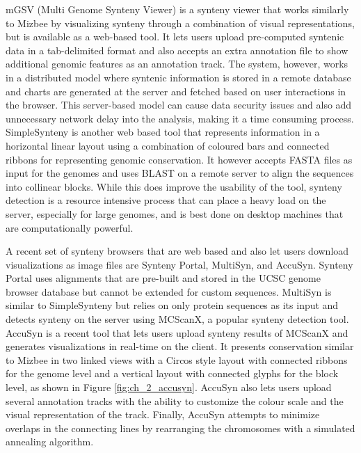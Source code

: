 mGSV (Multi Genome Synteny Viewer) is a synteny viewer that works similarly to Mizbee by visualizing synteny through a combination of visual representations, but is available as a web-based tool\cite{revanna2011gsv}. It lets users upload pre-computed syntenic data in a tab-delimited format and also accepts an extra annotation file to show additional genomic features as an annotation track. The system, however, works in a distributed model where syntenic information is stored in a remote database and charts are generated at the server and fetched based on user interactions in the browser. This server-based model can cause data security issues and also add unnecessary network delay into the analysis, making it a time consuming process. SimpleSynteny is another web based tool that represents information in a horizontal linear layout using a combination of coloured bars and connected ribbons for representing genomic conservation\cite{veltri2016simplesynteny}. It however accepts FASTA files as input for the genomes and uses BLAST\cite{blasttool} on a remote server to align the sequences into collinear blocks. While this does improve the usability of the tool, synteny detection is a resource intensive process that can place a heavy load on the server, especially for large genomes, and is best done on desktop machines that are computationally powerful.

A recent set of synteny browsers that are web based and also let users download visualizations as image files are Synteny Portal, MultiSyn, and AccuSyn. Synteny Portal uses alignments that are pre-built and stored in the UCSC genome browser database but cannot be extended for custom sequences\cite{lee2016syntenyportal}. MultiSyn\cite{baek2016multisyn} is similar to SimpleSynteny but relies on only protein sequences as its input and detects synteny on the server using MCScanX\cite{wang2012mcscanx}, a popular synteny detection tool. AccuSyn\cite{accusyn} is a recent tool that lets users upload synteny results of MCScanX and generates visualizations in real-time on the client. It presents conservation similar to Mizbee in two linked views with a Circos style layout with connected ribbons for the genome level and a vertical layout with connected glyphs for the block level, as shown in Figure \ref{fig:ch_2_accusyn}. AccuSyn also lets users upload several annotation tracks with the ability to customize the colour scale and the visual representation of the track. Finally, AccuSyn attempts to minimize overlaps in the connecting lines by rearranging the chromosomes with a simulated annealing algorithm.

